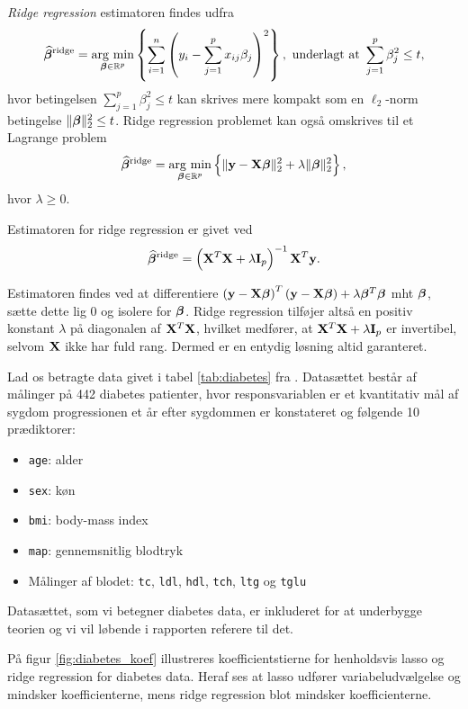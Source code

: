 \textit{Ridge regression} estimatoren findes udfra 
\begin{align} 
\widehat{\tbeta}^\text{ridge} = \argmin_{\tbeta \in \R^p} \cbr{\sum_{i=1}^n \del{y_i - \sum_{j=1}^p x_{ij} \beta_j}^2}, \ \text{underlagt at } \sum_{j=1}^p \beta_j^2 \leq t, \label{eq:2.7} 
\end{align} 
hvor betingelsen $\sum_{j=1}^p \beta_j^2 \leq t$ kan skrives mere kompakt som en \(\ell_2\)-norm betingelse $\Vert \boldsymbol{\beta} \Vert_2^2 \leq t$.
Ridge regression problemet kan også omskrives til et Lagrange problem
\begin{align*}
\widehat{\tbeta}^\text{ridge} = \argmin_{\tbeta \in \R^p} \cbr{ \Vert \y - \X \tbeta \Vert_2^2 + \lambda \Vert \tbeta \Vert_2^2},
\end{align*}
hvor $\lambda \geq 0$.
\begin{defn}
Estimatoren for ridge regression er givet ved
\begin{align} 
\widehat{\tbeta}^\text{ridge} = \del{\X^T \X + \lambda \mathbf{I}_p}^{-1} \X^T \y. \label{eq:ridge_estimator}
\end{align} 
\end{defn}
Estimatoren findes ved at differentiere \(\del{\y - \X \tbeta}^T \del{\y - \X \tbeta} + \lambda \tbeta^T \tbeta\) mht $\boldsymbol{\beta}$, sætte dette lig 0 og isolere for $\boldsymbol{\beta}$.
Ridge regression tilføjer altså en positiv konstant $\lambda$ på diagonalen af $\mathbf{X}^T \mathbf{X}$, hvilket medfører, at \(\mathbf{X}^T \mathbf{X} + \lambda \mathbf{I}_p\) er invertibel, selvom $\mathbf{X}$ ikke har fuld rang. 
Dermed er en entydig løsning altid garanteret. 
%
\begin{exmp}
Lad os betragte data givet i tabel \ref{tab:diabetes} fra \citep{efron}.
Datasættet består af målinger på 442 diabetes patienter, hvor responsvariablen er et kvantitativ mål af sygdom progressionen et år efter sygdommen er konstateret og følgende 10 prædiktorer: 
\begin{itemize}
\item \texttt{age}: alder
\item \texttt{sex}: køn
\item \texttt{bmi}: body-mass index
\item \texttt{map}: gennemsnitlig blodtryk
\item Målinger af blodet:  \texttt{tc},  \texttt{ldl}, \texttt{hdl}, \texttt{tch}, \texttt{ltg} og \texttt{tglu}
\end{itemize}
%

%
Datasættet, som vi betegner diabetes data, er inkluderet for at underbygge teorien og vi vil løbende i rapporten referere til det.
\end{exmp}
%
\begin{eks}
På figur \ref{fig:diabetes_koef} illustreres koefficientstierne for henholdsvis lasso og ridge regression for diabetes data.
Heraf ses at lasso udfører variabeludvælgelse og mindsker koefficienterne, mens ridge regression blot mindsker koefficienterne.
%

\end{eks}

